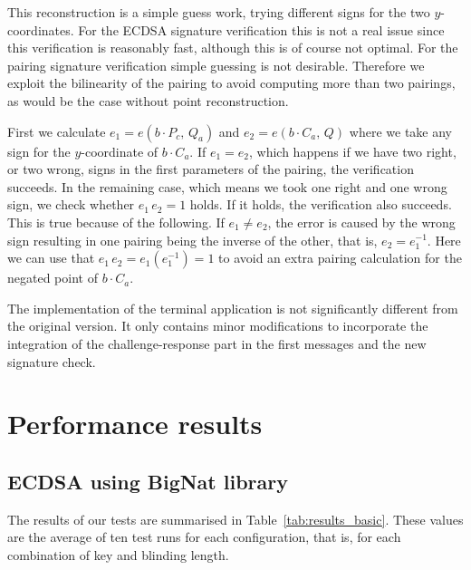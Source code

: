 This reconstruction is a simple guess work, trying different signs for
the two $y$-coordinates. For the ECDSA signature verification this is not a
real issue since this verification is reasonably fast, although this is of
course not optimal. For the pairing signature verification simple guessing
is not desirable. Therefore we exploit the bilinearity of the pairing to
avoid computing more than two pairings, as would be the case without point
reconstruction.

First we calculate $e_1 = e(b\cdot P_c,\, Q_a)$ and $e_2 = e(b\cdot C_a,\, Q)$
where we take any sign for the $y$-coordinate of $b\cdot C_a$. If $e_1 = e_2$,
which happens if we have two right, or two wrong, signs in the first
parameters of the pairing, the verification succeeds. In the remaining case,
which means we took one right and one wrong sign, we check whether
$e_1\, e_2 = 1$ holds. If it holds, the verification also succeeds. This is
true because of the following. If $e_1 \neq e_2$, the error is caused by the
wrong sign resulting in one pairing being the inverse of the other, that is,
$e_2 = e_1^{-1}$. Here we can use that $e_1\, e_2 = e_1 (e_1^{-1}) = 1$ to
avoid an extra pairing calculation for the negated point of $b\cdot C_a$.


The implementation of the terminal application is not significantly
different from the original version. It only contains minor
modifications to incorporate the integration of the challenge-response
part in the first messages and the new signature check.

\section{Performance results}

\subsection{ECDSA using BigNat library}

The results of our tests are summarised in Table~\ref{tab:results_basic}. These
values are the average of ten test runs for each configuration, that is, for
each combination of key and blinding length.

